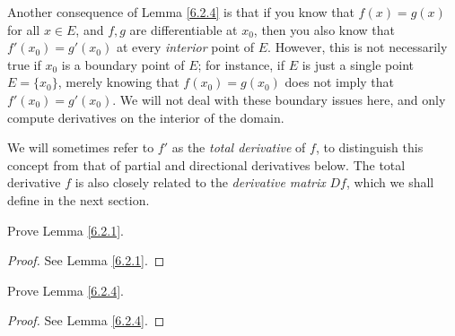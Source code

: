 \begin{note}
    Another consequence of Lemma \ref{6.2.4} is that if you know that \(f(x) = g(x)\) for all \(x \in E\), and \(f, g\) are differentiable at \(x_0\), then you also know that \(f'(x_0) = g'(x_0)\) at every \emph{interior} point of \(E\).
    However, this is not necessarily true if \(x_0\) is a boundary point of \(E\);
    for instance, if \(E\) is just a single point \(E = \{x_0\}\), merely knowing that \(f(x_0) = g(x_0)\) does not imply that \(f'(x_0) = g'(x_0)\).
    We will not deal with these boundary issues here, and only compute derivatives on the interior of the domain.
\end{note}

\begin{note}
    We will sometimes refer to \(f'\) as the \emph{total derivative} of \(f\), to distinguish this concept from that of partial and directional derivatives below.
    The total derivative \(f\) is also closely related to the \emph{derivative matrix} \(Df\),
    which we shall define in the next section.
\end{note}

\exercisesection

\begin{exercise}\label{ex 6.2.1}
    Prove Lemma \ref{6.2.1}.
\end{exercise}

\begin{proof}
    See Lemma \ref{6.2.1}.
\end{proof}

\begin{exercise}\label{ex 6.2.2}
    Prove Lemma \ref{6.2.4}.
\end{exercise}

\begin{proof}
    See Lemma \ref{6.2.4}.
\end{proof}